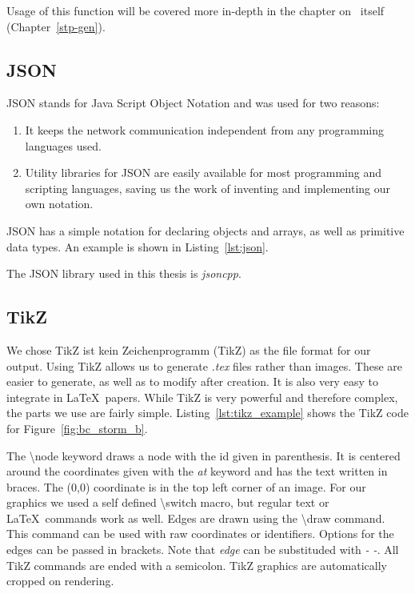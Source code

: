 Usage of this function will be covered more in-depth in the chapter on \tool\ itself (Chapter~\ref{stp-gen}).
\subsection*{JSON}
\label{json}
JSON stands for Java Script Object Notation and was used for two reasons:
\begin{enumerate}
    \item It keeps the network communication independent from any programming languages used.
    \item Utility libraries for JSON are easily available for most programming and scripting languages, saving us the work of inventing and implementing our own notation.
\end{enumerate}
JSON has a simple notation for declaring objects and arrays, as well as primitive data types.
An example is shown in Listing~\ref{lst:json}.

The JSON library used in this thesis is \textit{jsoncpp}\cite{jsoncpp}.

\subsection*{TikZ}
\label{tikz}
We chose TikZ ist kein Zeichenprogramm (TikZ)\cite{tikz} as the file format for our output.
Using TikZ allows us to generate \textit{.tex} files rather than images.
These are easier to generate, as well as to modify after creation.
It is also very easy to integrate in \LaTeX\ papers.
While TikZ is very powerful and therefore complex, the parts we use are fairly simple.
Listing~\ref{lst:tikz_example} shows the TikZ code for Figure~\ref{fig:bc_storm_b}.

The \textbackslash node keyword draws a node with the id given in parenthesis.
It is centered around the coordinates given with the \textit{at} keyword and has the text written in braces.
The (0,0) coordinate is in the top left corner of an image.
For our graphics we used a self defined \textbackslash switch macro, but regular text or \LaTeX\ commands work as well.
Edges are drawn using the \textbackslash draw command.
This command can be used with raw coordinates or identifiers.
Options for the edges can be passed in brackets.
Note that \textit{edge} can be substituded with \textit{- -}.
All TikZ commands are ended with a semicolon.
TikZ graphics are automatically cropped on rendering.

